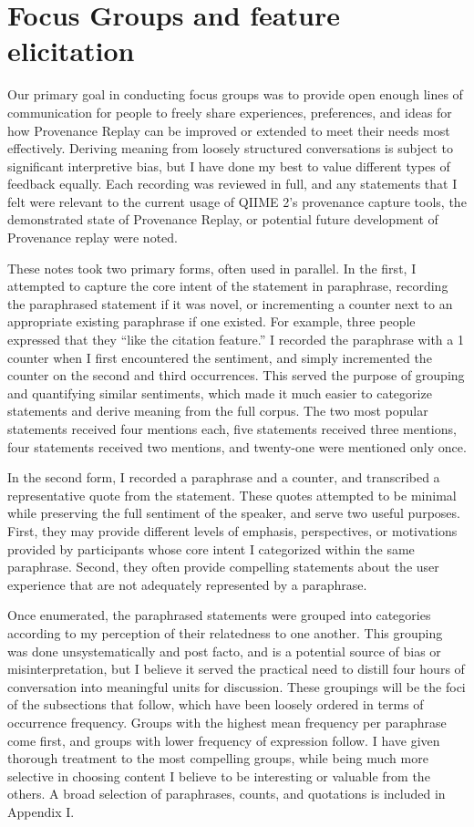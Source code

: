 \section{Focus Groups and feature elicitation}

Our primary goal in conducting focus groups was to provide open enough lines of
communication for people to freely share experiences, preferences, and ideas for
how Provenance Replay can be improved or extended to meet their needs most
effectively. Deriving meaning from loosely structured conversations is subject
to significant interpretive bias, but I have done my best to value different
types of feedback equally. Each recording was reviewed in full, and any
statements that I felt were relevant to the current usage of QIIME 2’s
provenance capture tools, the demonstrated state of Provenance Replay, or
potential future development of Provenance replay were noted. 

These notes took two primary forms, often used in parallel. In the first, I
attempted to capture the core intent of the statement in paraphrase, recording
the paraphrased statement if it was novel, or incrementing a counter next to an
appropriate existing paraphrase if one existed. For example, three people
expressed that they “like the citation feature.” I recorded the paraphrase with
a 1 counter when I first encountered the sentiment, and simply incremented the
counter on the second and third occurrences. This served the purpose of grouping
and quantifying similar sentiments, which made it much easier to categorize
statements and derive meaning from the full corpus. The two most popular
statements received four mentions each, five statements received three mentions,
four statements received two mentions, and twenty-one were mentioned only once.

In the second form, I recorded a paraphrase and a counter, and transcribed a
representative quote from the statement. These quotes attempted to be minimal
while preserving the full sentiment of the speaker, and serve two useful
purposes. First, they may provide different levels of emphasis, perspectives, or
motivations provided by participants whose core intent I categorized within the
same paraphrase. Second, they often provide compelling statements about the user
experience that are not adequately represented by a paraphrase.

Once enumerated, the paraphrased statements were grouped into categories
according to my perception of their relatedness to one another. This grouping
was done unsystematically and post facto, and is a potential source of bias or
misinterpretation, but I believe it served the practical need to distill four
hours of conversation into meaningful units for discussion. These groupings will
be the foci of the subsections that follow, which have been loosely ordered in
terms of occurrence frequency. Groups with the highest mean frequency per
paraphrase come first, and groups with lower frequency of expression follow. I
have given thorough treatment to the most compelling groups, while being much
more selective in choosing content I believe to be interesting or valuable from
the others. A broad selection of paraphrases, counts, and quotations is included
in Appendix I.

